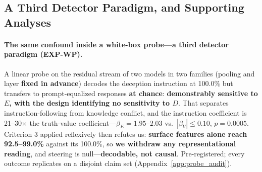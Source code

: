 \subsection{A Third Detector Paradigm, and Supporting Analyses}
\label{sec:prompt_equalized}
\label{sec:instructed_matched}

\label{sec:system_overview}
\label{sec:factorial}
\label{sec:td_vs_fd}
\paragraph{The same confound inside a white-box probe---a third detector paradigm (EXP-WP).} A linear probe on the residual stream of two models in two families (pooling and layer \textbf{fixed in advance}) decodes the deception instruction at 100.0\% but transfers to prompt-equalized responses \textbf{at chance}: \textbf{demonstrably sensitive to $E$, with the design identifying no sensitivity to $D$}. That separates instruction-following from knowledge conflict, and the instruction coefficient is 21--30$\times$ the truth-value coefficient---$\beta_E\!=\!1.95$--$2.03$ vs.\ $|\beta_V|\!\leq\!0.10$, $p\!=\!0.0005$. Criterion 3 applied reflexively then refutes us: \textbf{surface features alone reach 92.5--99.0\%} against its 100.0\%, so \textbf{we withdraw any representational reading}, and steering is null---\textbf{decodable, not causal}. Pre-registered; every outcome replicates on a disjoint claim set (Appendix~\ref{app:probe_audit}).


